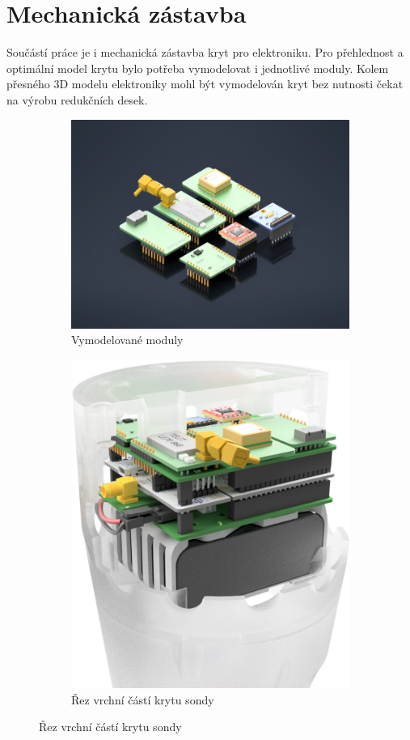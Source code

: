 \documentclass[twoside]{ctuthesis}
\theoremstyle{plain}
\theoremstyle{definition}
\theoremstyle{note}
\begin{document}
	\section{Mechanická zástavba}

	Součástí práce je i mechanická zástavba kryt pro elektroniku. Pro přehlednost a optimální model krytu bylo potřeba vymodelovat i jednotlivé moduly. Kolem přesného 3D modelu elektroniky mohl být vymodelován kryt bez nutnosti čekat na výrobu redukčních desek.
	\begin{figure}[hbtp]
		\centering
		\begin{subfigure}{.5\textwidth}
			\centering
			\includegraphics[height=.7\linewidth]{Figures/modules_assembly.png} 
			\caption{Vymodelované moduly}
			\label{fig:modules:assembly}
		\end{subfigure}%
		\begin{subfigure}{.5\textwidth}
			\centering
			\includegraphics[height=.7\linewidth]{Figures/ALL_rez_white.png}
			\caption{Řez vrchní částí krytu sondy}
			\label{fig:all:rez}
		\end{subfigure}
		\label{fig:shields}
	\end{figure}
\end{document}
